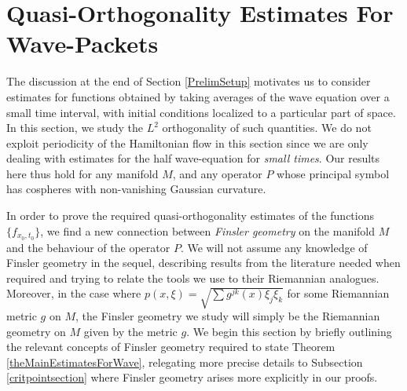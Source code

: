 \section{Quasi-Orthogonality Estimates For Wave-Packets} \label{estimatesforwavepackets}

The discussion at the end of Section \ref{PrelimSetup} motivates us to consider estimates for functions obtained by taking averages of the wave equation over a small time interval, with initial conditions localized to a particular part of space. In this section, we study the $L^2$ orthogonality of such quantities. We do not exploit periodicity of the Hamiltonian flow in this section since we are only dealing with estimates for the half wave-equation for \emph{small times}. Our results here thus hold for any manifold $M$, and any operator $P$ whose principal symbol has cospheres with non-vanishing Gaussian curvature.

In order to prove the required quasi-orthogonality estimates of the functions $\{ f_{x_0,t_0} \}$, we find a new connection between \emph{Finsler geometry} on the manifold $M$ and the behaviour of the operator $P$. We will not assume any knowledge of Finsler geometry in the sequel, describing results from the literature needed when required and trying to relate the tools we use to their Riemannian analogues. Moreover, in the case where $p(x,\xi) = \sqrt{\sum g^{jk}(x) \xi_j \xi_k}$ for some Riemannian metric $g$ on $M$, the Finsler geometry we study will simply be the Riemannian geometry on $M$ given by the metric $g$. We begin this section by briefly outlining the relevant concepts of Finsler geometry required to state Theorem \ref{theMainEstimatesForWave}, relegating more precise details to Subsection \ref{critpointsection} where Finsler geometry arises more explicitly in our proofs.


